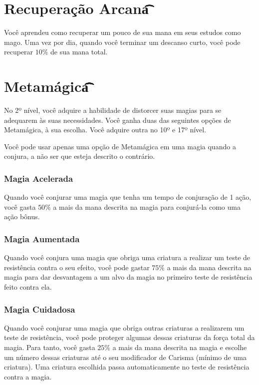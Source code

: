 \documentclass{RPG_Adventure}[2021/10/20]
\begin{document}
\section*{Recuperação Arcana\t\t\t\t\t}%
\label{sec:recuperacao_arcana}

Você aprendeu como recuperar um pouco de sua mana em seus estudos como mago. Uma
vez por dia, quando você terminar um descanso curto, você pode recuperar $10\%$
de sua mana total.

\section*{Metamágica\t\t\t\t\t\t\t\t\t\t\t}%
\label{sec:metamagica}

No 2º nível, você adquire a habilidade de distorcer suas magias para se
adequarem às suas necessidades. Você ganha duas das seguintes opções de
Metamágica, à sua escolha. Você adquire outra no 10º e 17º nível.

Você pode usar apenas uma opção de Metamágica em uma magia quando a conjura, a
não ser que esteja descrito o contrário.

\subsubsection*{Magia Acelerada}%
\label{ssub:magia_acelerada}

Quando você conjurar uma magia que tenha um tempo de conjuração de 1 ação, você
gasta $50\%$ a mais da mana descrita na magia para conjurá-la como uma ação
bônus.

\subsubsection*{Magia Aumentada}%
\label{ssub:magia_aumentada}

Quando você conjura uma magia que obriga uma criatura a realizar um teste de
resistência contra o seu efeito, você pode gastar $75\%$ a mais da mana descrita
na magia para dar desvantagem a um alvo da magia no primeiro teste de
resistência feito contra ela.

\subsubsection*{Magia Cuidadosa}%
\label{ssub:magia_cuidadosa}

Quando você conjurar uma magia que obriga outras criaturas a realizarem um teste
de resistência, você pode proteger algumas dessas criaturas da força total da
magia. Para tanto, você gasta $25\%$ a mais da mana descrita na magia e escolhe
um número dessas criaturas até o seu modificador de Carisma (mínimo de uma
criatura). Uma criatura escolhida passa automaticamente no teste de resistência
contra a magia.
\end{document}
